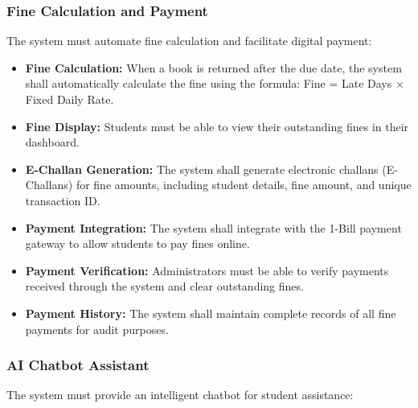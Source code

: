 \documentclass[12pt,a4paper]{report}
\begin{document}
\subsubsection{Fine Calculation and Payment}

The system must automate fine calculation and facilitate digital payment:

\begin{itemize}
    \item \textbf{Fine Calculation:} When a book is returned after the due date, the system shall automatically calculate the fine using the formula: Fine = Late Days × Fixed Daily Rate.
    
    \item \textbf{Fine Display:} Students must be able to view their outstanding fines in their dashboard.
    
    \item \textbf{E-Challan Generation:} The system shall generate electronic challans (E-Challans) for fine amounts, including student details, fine amount, and unique transaction ID.
    
    \item \textbf{Payment Integration:} The system shall integrate with the 1-Bill payment gateway to allow students to pay fines online.
    
    \item \textbf{Payment Verification:} Administrators must be able to verify payments received through the system and clear outstanding fines.
    
    \item \textbf{Payment History:} The system shall maintain complete records of all fine payments for audit purposes.
\end{itemize}

\subsubsection{AI Chatbot Assistant}

The system must provide an intelligent chatbot for student assistance:
\end{document}
